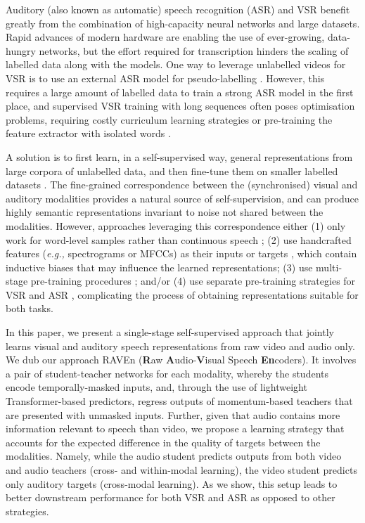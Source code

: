 \documentclass{article} \usepackage{iclr2023_conference,times}
\begin{document}
Auditory (also known as automatic) speech recognition (ASR) and VSR benefit greatly from the combination of high-capacity neural networks and large datasets. Rapid advances of modern hardware are enabling the use of ever-growing, data-hungry networks, but the effort required for transcription hinders the scaling of labelled data along with the models. One way to leverage unlabelled videos for VSR is to use an external ASR model for pseudo-labelling \citep{afouras2020asr, ma2022visual}. However, this requires a large amount of labelled data to train a strong ASR model in the first place, and supervised VSR training with long sequences often poses optimisation problems, requiring costly curriculum learning strategies \citep{chung2017lip, ma2022visual} or pre-training the feature extractor with isolated words \citep{afouras2018deep, ma2021end}.

A solution is to first learn, in a self-supervised way, general representations from large corpora of unlabelled data, and then fine-tune them on smaller labelled datasets \citep{mohamed2022self}. The fine-grained correspondence between the (synchronised) visual and auditory modalities provides a natural source of self-supervision, and can produce highly semantic representations invariant to noise not shared between the modalities. However, approaches leveraging this correspondence either (1) only work for word-level samples rather than continuous speech \citep{chung2016out, chung2019perfect, chung2020seeing}; (2) use handcrafted features (\textit{e.g.,} spectrograms or MFCCs) as their inputs or targets \citep{ma2021lira, shi2022learning}, which contain inductive biases that may influence the learned representations; (3) use multi-stage pre-training procedures \citep{ma2021lira, shi2022learning, pan2022leveraging}; and/or (4) use separate pre-training strategies for VSR and ASR \citep{shi2022learning}, complicating the process of obtaining representations suitable for both tasks.

In this paper, we present a single-stage self-supervised approach that jointly learns visual and auditory speech representations from raw video and audio only. We dub our approach RAVEn (\textbf{R}aw \textbf{A}udio-\textbf{V}isual Speech \textbf{En}coders). It involves a pair of student-teacher networks for each modality, whereby the students encode temporally-masked inputs, and, through the use of lightweight Transformer-based predictors, regress outputs of momentum-based teachers \citep{grill2020bootstrap, caron2021emerging} that are presented with unmasked inputs. Further, given that audio contains more information relevant to speech than video, we propose a learning strategy that accounts for the expected difference in the quality of targets between the modalities. Namely, while the audio student predicts outputs from both video and audio teachers (cross- and within-modal learning), the video student predicts only auditory targets (cross-modal learning). As we show, this setup leads to better downstream performance for both VSR and ASR as opposed to other strategies.
\end{document}
